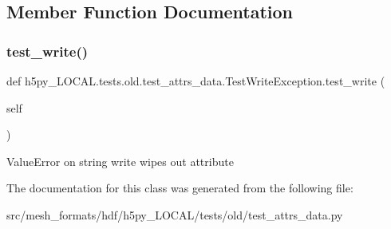 \subsection{Member Function Documentation}
\mbox{\label{classh5py__LOCAL_1_1tests_1_1old_1_1test__attrs__data_1_1TestWriteException_acb4d082f513ebda5aa6653908e45fe19}} 
\subsubsection{\texorpdfstring{test\+\_\+write()}{test\_write()}}
{\footnotesize\ttfamily def h5py\+\_\+\+L\+O\+C\+A\+L.\+tests.\+old.\+test\+\_\+attrs\+\_\+data.\+Test\+Write\+Exception.\+test\+\_\+write (\begin{DoxyParamCaption}\item[{}]{self }\end{DoxyParamCaption})}

\begin{DoxyVerb}ValueError on string write wipes out attribute \end{DoxyVerb}
 

The documentation for this class was generated from the following file\+:\begin{DoxyCompactItemize}
\item 
src/mesh\+\_\+formats/hdf/h5py\+\_\+\+L\+O\+C\+A\+L/tests/old/test\+\_\+attrs\+\_\+data.\+py\end{DoxyCompactItemize}

